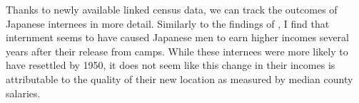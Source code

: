 Thanks to newly available linked census data, we can track the outcomes of Japanese internees in more detail.
Similarly to the findings of \cite{arellano-boverDisplacementDiversityMobility2022}, 
I find that internment seems to have caused Japanese men to earn higher incomes several years after their release from camps.
While these internees were more likely to have resettled by 1950, it does not seem like this change in their incomes is attributable to the quality of their new location as measured by median county salaries.
